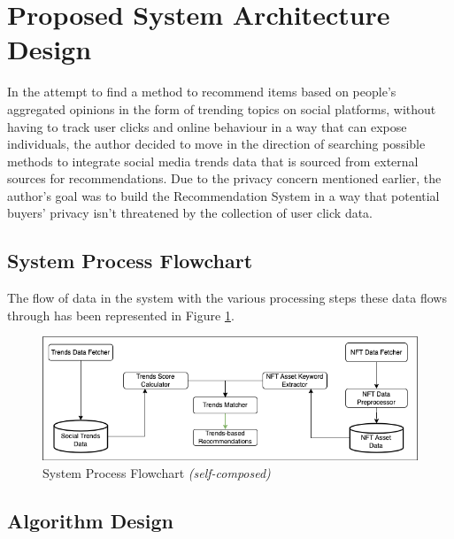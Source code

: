 \documentclass[manuscript,natbib=false, anonymous]{acmart}
\begin{document}

\section{Proposed System Architecture Design}

In the attempt to find a method to recommend items based on people's aggregated opinions in the form of trending topics on social platforms, without having to track user clicks and online behaviour in a way that can expose individuals, the author decided to move in the direction of searching possible methods to integrate social media trends data that is sourced from external sources for recommendations.
Due to the privacy concern mentioned earlier, the author's goal was to build the Recommendation System in a way that potential buyers' privacy isn't threatened by the collection of user click data.

\subsection{System Process Flowchart}

The flow of data in the system with the various processing steps these data flows through has been represented in Figure \ref{fig:trends-recsys-system-process-flowchart}.

\begin{figure}[h]
\centering
\includegraphics[width=\linewidth]{images/system-process.png}
\caption{System Process Flowchart \textit{(self-composed)}}
\label{fig:trends-recsys-system-process-flowchart}
\end{figure}

\subsection{Algorithm Design}
\end{document}

